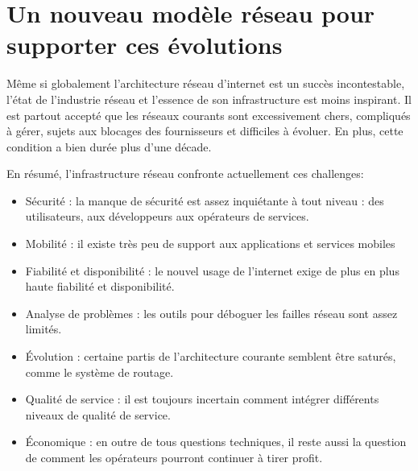 \section{Un nouveau modèle réseau pour supporter ces évolutions}


Même si globalement l'architecture réseau d'internet est un succès incontestable, l'état de l'industrie réseau et l'essence de son infrastructure est moins inspirant. Il est partout accepté que les réseaux courants sont excessivement chers, compliqués à gérer, sujets aux blocages des fournisseurs et difficiles à évoluer. En plus, cette condition a bien durée plus d'une décade. \cite{fabricIntro}



En résumé, l'infrastructure réseau confronte actuellement ces challenges:
\begin{itemize}
\item Sécurité : la manque de sécurité est assez inquiétante à tout niveau : des utilisateurs, aux développeurs aux opérateurs de services.
\item Mobilité : il existe très peu de support aux applications et services mobiles
\item Fiabilité et disponibilité : le nouvel usage de l'internet exige de plus en plus haute fiabilité et disponibilité.
\item Analyse de problèmes : les outils pour déboguer les failles réseau sont assez limités.
\item Évolution : certaine partis de l'architecture courante semblent être saturés, comme le système de routage.
\item Qualité de service : il est toujours incertain comment intégrer différents niveaux de qualité de service.
\item Économique : en outre de tous questions techniques, il reste aussi la question de comment les opérateurs pourront continuer à tirer profit.
\end{itemize}
\cite{InernetCleanSlateDesignIntro}

